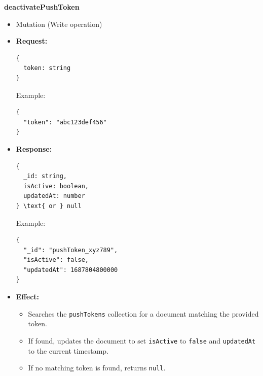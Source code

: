 \documentclass[a4paper,12pt]{article}
\begin{document}
\item \textbf{deactivatePushToken}
  \begin{itemize}
    \item Mutation (Write operation)
    \item \textbf{Request:}
    \begin{verbatim}
{
  token: string
}
    \end{verbatim}
    Example:
    \begin{verbatim}
{
  "token": "abc123def456"
}
    \end{verbatim}
    \item \textbf{Response:}
    \begin{verbatim}
{
  _id: string,
  isActive: boolean,
  updatedAt: number
} \text{ or } null
    \end{verbatim}
    Example:
    \begin{verbatim}
{
  "_id": "pushToken_xyz789",
  "isActive": false,
  "updatedAt": 1687804800000
}
    \end{verbatim}
    \item \textbf{Effect:}
    \begin{itemize}
      \item Searches the \texttt{pushTokens} collection for a document matching the provided token.
      \item If found, updates the document to set \texttt{isActive} to \texttt{false} and \texttt{updatedAt} to the current timestamp.
      \item If no matching token is found, returns \texttt{null}.
    \end{itemize}
  \end{itemize}
\end{document}
